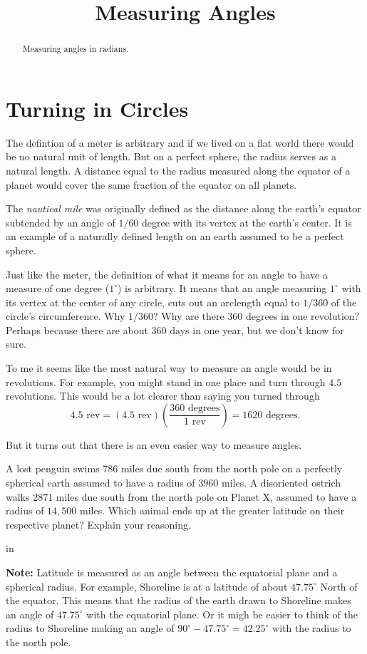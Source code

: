 \documentclass{ximera}
\title{Measuring Angles}
\newcommand{\pskip}{\vskip 0.1 in}
\begin{document}
\begin{abstract}
Measuring angles in radians.
\end{abstract}
\maketitle

\section{Turning in Circles}

The defintion of a meter is arbitrary and if we lived on a flat world there would be no natural unit of length. But on a perfect sphere, the radius serves as a natural length. A distance equal to the radius measured along the equator of a planet would cover the same fraction of the equator on all planets.

The \emph{nautical mile} was originally defined as the distance along the earth's equator subtended by an angle of $1/60$ degree with its vertex at the earth's center. It is an example of a naturally defined length on an earth assumed to be a perfect sphere.

Just like the meter, the definition of what it means for an angle to have a measure of one degree ($1^\circ$) is arbitrary. It means that an angle measuring $1^\circ$ with its vertex at the center of any circle, cuts out an arclength equal to $1/360$ of the circle's circumference. Why $1/360$? Why are there 360 degrees in one revolution? Perhaps because there are about 360 days in one year, but we don't know for sure.

To me it seems like the most natural way to measure an angle would be in revolutions. For example, you might stand in one place and turn through $4.5$ revolutions. This would be a lot clearer than saying you turned through
\[
   4.5 \text{ rev} = (4.5 \text{ rev} ) \left( \frac{360 \text{ degrees}}{1 \text{ rev}} \right) = 1620 \text{ degrees}.
\]

But it turns out that there is an even easier way to measure angles. %

\begin{question}  \label{Q0:Radians}
A lost penguin swims 786 miles due south from the north pole on a perfectly spherical earth assumed to have a radius of $3960$ miles. A disoriented ostrich walks $2871$ miles due south from the north pole on Planet X, assumed to have a radius of $14,500$ miles. Which animal ends up at the greater latitude on their respective planet? Explain your reasoning.

\pskip

{\bf Note:} Latitude is measured as an angle between the equatorial plane and a spherical radius. For example, Shoreline is at a latitude of about $47.75^\circ$ North of the equator. This means that the radius of the earth drawn to Shoreline makes an angle of  $47.75^\circ$ with the equatorial plane. Or it migh be easier to think of the radius to Shoreline making an angle of $90^\circ - 47.75^\circ = 42.25^\circ$ with the radius to the north pole. %
\end{question}
\end{document}
